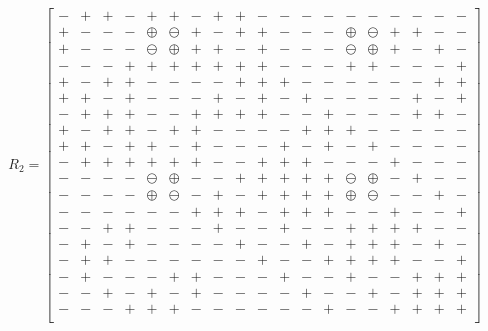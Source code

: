 \[R_2 = \left[\begin{smallmatrix}
-&+&+&-&+&+&-&+&+&-&-&-&-&-&-&-&-&-&-\\
+&-&-&-&\oplus&\ominus&+&-&+&+&-&-&-&\oplus&\ominus&+&+&-&-\\
+&-&-&-&\ominus&\oplus&+&+&-&+&-&-&-&\ominus&\oplus&+&-&+&-\\
-&-&-&+&+&+&+&+&+&+&-&-&-&+&+&-&-&-&+\\
+&-&+&+&-&-&-&-&+&+&+&-&-&-&-&-&-&+&+\\
+&+&-&+&-&-&-&+&-&+&-&+&-&-&-&-&+&-&+\\
-&+&+&+&-&-&+&+&+&+&-&-&+&-&-&-&+&+&-\\
+&-&+&+&-&+&+&-&-&-&-&+&+&+&-&-&-&-&-\\
+&+&-&+&+&-&+&-&-&-&+&-&+&-&+&-&-&-&-\\
-&+&+&+&+&+&+&-&-&+&+&+&-&-&-&+&-&-&-\\
-&-&-&-&\ominus&\oplus&-&-&+&+&+&+&+&\ominus&\oplus&-&+&-&-\\
-&-&-&-&\oplus&\ominus&-&+&-&+&+&+&+&\oplus&\ominus&-&-&+&-\\
-&-&-&-&-&-&+&+&+&-&+&+&+&-&-&+&-&-&+\\
-&-&+&+&-&-&-&+&-&-&+&-&-&+&+&+&+&-&-\\
-&+&-&+&-&-&-&-&+&-&-&+&-&+&+&+&-&+&-\\
-&+&+&-&-&-&-&-&-&+&-&-&+&+&+&+&-&-&+\\
-&+&-&-&-&+&+&-&-&-&+&-&-&+&-&-&+&+&+\\
-&-&+&-&+&-&+&-&-&-&-&+&-&-&+&-&+&+&+\\
-&-&-&+&+&+&-&-&-&-&-&-&+&-&-&+&+&+&+\\
\end{smallmatrix}\right]\]
